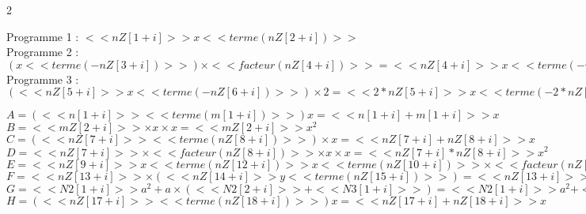 

\setcounter{exo}{0}
\vfill
\begin{correction}
\begin{multicols}{2}
%
%


Programme 1 : $<<nZ[1+i]>> x <<terme(nZ[2+i])>>$\\
Programme 2 : $(x <<terme(-nZ[3+i])>>)\times <<facteur(nZ[4+i])>>= <<nZ[4+i]>>  x  << terme(- nZ[4+i] * nZ[3+i] ) >> $\\
Programme 3 : $( <<nZ[5+i]>> x <<terme(-nZ[6+i])>> )\times 2= <<2* nZ[5+i]>> x <<terme(-2*nZ[6+i])>>$




$A=(<<n[1+i]>>  <<terme(m[1+i])>>) x=<<n[1+i] +m[1+i]>> x$\\
$B=<<mZ[2+i]>> \times x\times x=<<mZ[2+i]>> x^2$\\
$C=(<<nZ[7+i]>> <<terme(nZ[8+i])>>) \times x=<<nZ[7+i] + nZ[8+i]>>  x$\\
$D=<<nZ[7+i]>>\times <<facteur(nZ[8+i])>>\times x\times x=<<nZ[7+i]* nZ[8+i]>> x^2$\\
$E= <<nZ[9+i]>>  x <<terme(nZ[12+i])>> x <<terme(nZ[10+i])>>\times <<facteur(nZ[11+i])>> = (<<nZ[9+i]>>  <<terme(nZ[12+i])>>) x <<terme(nZ[10+i] * nZ[11+i])>> = <<nZ[9+i] + nZ[12+i]>> x <<terme(nZ[10+i] * nZ[11+i])>> $\\
$F=<<nZ[13+i]>> \times (<<nZ[14+i]>>y <<terme(nZ[15+i])>>)  =<<nZ[13+i]>> \times <<facteur(nZ[14+i])>>y <<terme(nZ[13+i])>> \times <<facteur(nZ[15+i])>>
 =<<nZ[13+i]* nZ[14+i]>>y <<terme(nZ[13+i]*nZ[15+i])>> $\\
$G=<<N2[1+i]>> a^2+a\times (<<N2[2+i]>>+ <<N3[1+i]>>)=<<N2[1+i]>> a^2+<<N2[2+i] + N3[1+i]>>a$\\
$H= (<<nZ[17+i]>> <<terme(nZ[18+i])>>)x = <<nZ[17+i] + nZ[18+i]>>x$



\end{multicols}
\end{correction}
